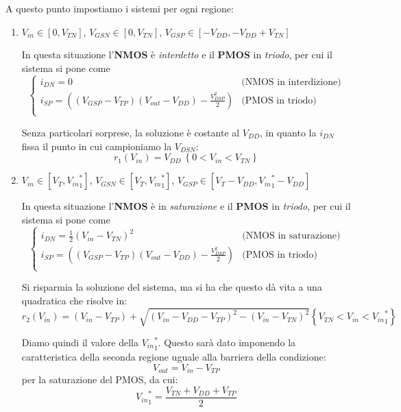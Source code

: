 \documentclass[a4paper,11pt]{article}
\begin{document}
A questo punto impostiamo i sistemi per ogni regione:
\begin{enumerate}
\item
\begin{center}
$V_{in} \in [0, V_{TN}]$,
$V_{GSN} \in [0, V_{TN}]$,
$V_{GSP} \in [- V_{DD}, - V_{DD} + V_{TN}]$ 
\end{center}

In questa situazione l'\textbf{NMOS} è \textit{interdetto} e il \textbf{PMOS} in \textit{triodo}, per cui il sistema si pone come
$$
\begin{cases}
i_{DN}=0 & \text{(NMOS in interdizione)} \\
i_{SP}=\left(\left(V_{GSP}-V_{TP}\right)\left(V_{out}-V_{DD}\right)-\frac{V_{DSP}^{2}}{2}\right) & \text{(PMOS in triodo)}\\
\end{cases}
$$

Senza particolari sorprese, la soluzione è costante al $V_{DD}$, in quanto la $i_{DN}$ fissa il punto in cui campioniamo la $V_{DSN}$:
$$
r_{1}\left(V_{in}\right)=V_{DD}\ \left\{0<V_{in}<V_{TN}\right\}
$$

\item 
\begin{center}
$V_{in} \in [V_T, {V_{in}}^*_1]$,
$V_{GSN} \in [V_T, {V_{in}}^*_1]$, 
$V_{GSP} \in [V_T - V_{DD}, {V_{in}}^*_1 - V_{DD}]$ \\
\end{center}

In questa situazione l'\textbf{NMOS} è in \textit{saturazione} e il \textbf{PMOS} in \textit{triodo}, per cui il sistema si pone come
$$
\begin{cases}
i_{DN}=\frac{1}{2}\left(V_{in}-V_{TN}\right)^{2} & \text{(NMOS in saturazione)} \\
i_{SP}=\left(\left(V_{GSP}-V_{TP}\right)\left(V_{out}-V_{DD}\right)-\frac{V_{DSP}^{2}}{2}\right) & \text{(PMOS in triodo)}\\
\end{cases}
$$

Si risparmia la soluzione del sistema, ma si ha che questo dà vita a una quadratica che risolve in:
$$
r_{2}\left(V_{in}\right)=\left(V_{in}-V_{TP}\right)+\sqrt{\left(V_{in}-V_{DD}-V_{TP}\right)^{2}-\left(V_{in}-V_{TN}\right)^{2}}\left\{V_{TN}<V_{in}<{V_{in}}^*_1\right\}
$$

Diamo quindi il valore della ${V_{in}}^*_1$. Questo sarà dato imponendo la caratteristica della seconda regione uguale alla barriera della condizione:
$$
V_{out} = V_{in} - V_{TP}
$$
per la saturazione del PMOS, da cui:
$$
{V_{in}}^*_1=\frac{V_{TN}+V_{DD}+V_{TP}}{2}
$$


\end{enumerate}
\end{document}
